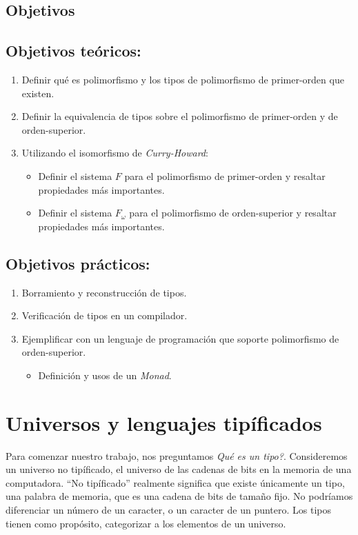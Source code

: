\documentclass[spanish,11pt]{article}
\begin{document}
\subsection{Objetivos}

\subsection{Objetivos teóricos:}
\begin{enumerate}
\item Definir qué es polimorfismo y los tipos de polimorfismo de primer-orden que existen.
\item Definir la equivalencia de tipos sobre el polimorfismo de primer-orden y de orden-superior.
\item Utilizando el isomorfismo de \textit{Curry-Howard}:
  \begin{itemize}
  \item Definir el sistema $F$ para el polimorfismo de primer-orden y resaltar propiedades más importantes.
  \item Definir el sistema $F_\omega$ para el polimorfismo de orden-superior y resaltar propiedades más importantes.
  \end{itemize}
\end{enumerate}

\subsection{Objetivos prácticos:}
\begin{enumerate}
\item Borramiento y reconstrucción de tipos.
\item Verificación de tipos en un compilador.
\item Ejemplificar con un lenguaje de programación que soporte polimorfismo de orden-superior.
  \begin{itemize}
  \item Definición y usos de un \textit{Monad}.
  \end{itemize}
\end{enumerate}

\section{Universos y lenguajes tipíficados}
Para comenzar nuestro trabajo, nos preguntamos \textit{Qué es un tipo?}. Consideremos un universo no tipíficado, el universo de las cadenas de bits en la memoria de una computadora. ``No tipíficado'' realmente significa que existe únicamente un tipo, una palabra de memoria, que es una cadena de bits de tamaño fijo. No podríamos diferenciar un número de un caracter, o un caracter de un puntero. Los tipos tienen como propósito, categorizar a los elementos de un universo.
\end{document}
